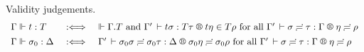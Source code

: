 \documentclass[acmlarge,review,anonymous]{acmart}\settopmatter{printfolios=true}
\newcommand{\LONGVERSION}[1]{}
\begin{document}
\LONGVERSION{ %
\begin{lemma}[Properties of the logical relation for substitution]
  \label{lem:wklrsub}
  Let $\LRSub \Gamma \sigma \tau \Delta \eta \rho$. Then:
  \begin{enumerate}
  \item Well-typedness: $\Gamma \der \sigma : \Delta$
   and $\Gamma \der \sigma = \sigma \eeq \tau : \Delta$
   [which in turn implies $\Gamma \der \tau : \Delta$].
  \item Weakening:
  If\/ $\xi : \Gamma' \leq \Gamma$ then
  $\LRSub{\Gamma'}{\sigma\xi}{\tau\xi}{\Delta}\eta\rho$.
  \item Resurrection:
  $\LRS {\resurrect\Gamma} \tau {\resurrect\Delta} \rho$.
  \item \label{it:sizesub} Size substitution:
  If\/ $\resurrect\Delta \der a : \Size$ then $a\eta \in \SIZE$.
  \end{enumerate}
\end{lemma}
} %
\LONGVERSION{
\begin{proof}
  For part (\ref{it:sizesub}), the only interesting case $a = \ind i + o$ can be proved by observing that $\eta(i) \in \SIZE$.
\end{proof}
} %

Validity judgements.
\[
\begin{array}{l@{\quad}l@{\quad}l}
  \Gamma \valid t : T & \defas & %
    \valid \cext \Gamma T \mand
    \LR {\Gamma'} {t \sigma} {T \tau} {t \eta} {T \rho}
    \mforall \LRSub {\Gamma'} \sigma \tau \Gamma \eta \rho
\\[1ex]
  \Gamma \valid \sigma_0 : \Delta & \defas &
    \LRSub {\Gamma'} {\sigma_0 \sigma} {\sigma_0 \tau} \Delta {\sigma_0 \eta} {\sigma_0 \rho}
    \mforall \LRSub {\Gamma'} {\sigma} {\tau} \Gamma {\eta} {\rho}
\end{array}
\]
\end{document}
